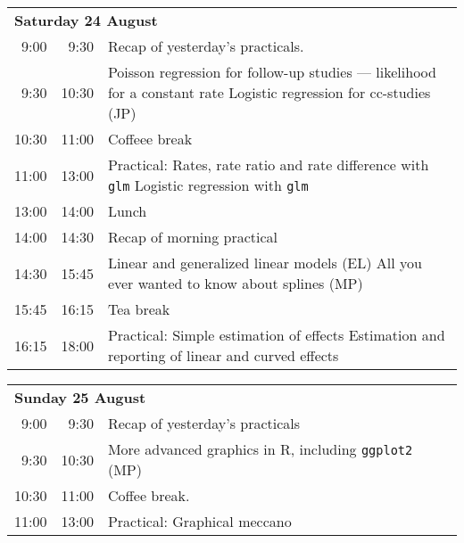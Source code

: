 \noindent
\begin{tabular}{r@{ -- }rp{13cm}}
\multicolumn{3}{l}{\bf Saturday 24 August} \\
 9:00 &  9:30 & Recap of yesterday's practicals. \\
 9:30 & 10:30 & Poisson regression for follow-up studies ---
                likelihood for a constant rate \newline
                Logistic regression for cc-studies (JP) \\
10:30 & 11:00 & Coffeee break \\
11:00 & 13:00 & Practical: Rates, rate ratio and rate difference with \texttt{glm}\newline
                Logistic regression with \texttt{glm} \\
13:00 & 14:00 & Lunch \\
14:00 & 14:30 & Recap of morning practical \\
14:30 & 15:45 & Linear and generalized linear models (EL) \newline
                All you ever wanted to know about splines (MP) \\
15:45 & 16:15 & Tea break\\
16:15 & 18:00 & Practical: Simple estimation of effects \newline
                Estimation and reporting of linear and curved effects \\[1em]
\end{tabular}

\noindent
\begin{tabular}{r@{ -- }rp{13cm}}
 \multicolumn{3}{l}{\bf Sunday 25 August} \\
 9:00 &  9:30 & Recap of yesterday's practicals \\
 9:30 & 10:30 & More advanced graphics in R, including \texttt{ggplot2} (MP)\\
10:30 & 11:00 & Coffee break. \\
11:00 & 13:00 & Practical: Graphical meccano \\[1em]
\end{tabular}


